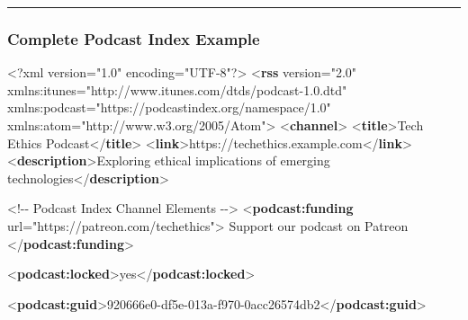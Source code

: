 \documentclass[
  letterpaper,
  DIV=11,
  numbers=noendperiod]{scrartcl}
\newenvironment{Shaded}{\begin{snugshade}}{\end{snugshade}}
\newcommand{\CommentTok}[1]{\textcolor[rgb]{0.37,0.37,0.37}{#1}}
\newcommand{\FunctionTok}[1]{\textcolor[rgb]{0.28,0.35,0.67}{#1}}
\newcommand{\KeywordTok}[1]{\textcolor[rgb]{0.00,0.23,0.31}{\textbf{#1}}}
\newcommand{\NormalTok}[1]{\textcolor[rgb]{0.00,0.23,0.31}{#1}}
\newcommand{\OtherTok}[1]{\textcolor[rgb]{0.00,0.23,0.31}{#1}}
\newcommand{\StringTok}[1]{\textcolor[rgb]{0.13,0.47,0.30}{#1}}
\begin{document}
\begin{center}\rule{0.5\linewidth}{0.5pt}\end{center}

\subsubsection{Complete Podcast Index
Example}\label{complete-podcast-index-example}

\begin{Shaded}
\begin{Highlighting}[]
\FunctionTok{\textless{}?xml}\OtherTok{ version=}\StringTok{"1.0"}\OtherTok{ encoding=}\StringTok{"UTF{-}8"}\FunctionTok{?\textgreater{}}
\NormalTok{\textless{}}\KeywordTok{rss}\OtherTok{ version=}\StringTok{"2.0"} 
\OtherTok{  xmlns:itunes=}\StringTok{"http://www.itunes.com/dtds/podcast{-}1.0.dtd"}
\OtherTok{     xmlns:podcast=}\StringTok{"https://podcastindex.org/namespace/1.0"}
\OtherTok{     xmlns:atom=}\StringTok{"http://www.w3.org/2005/Atom"}\NormalTok{\textgreater{}}
\NormalTok{  \textless{}}\KeywordTok{channel}\NormalTok{\textgreater{}}
\NormalTok{    \textless{}}\KeywordTok{title}\NormalTok{\textgreater{}Tech Ethics Podcast\textless{}/}\KeywordTok{title}\NormalTok{\textgreater{}}
\NormalTok{    \textless{}}\KeywordTok{link}\NormalTok{\textgreater{}https://techethics.example.com\textless{}/}\KeywordTok{link}\NormalTok{\textgreater{}}
\NormalTok{    \textless{}}\KeywordTok{description}\NormalTok{\textgreater{}Exploring ethical implications of emerging technologies\textless{}/}\KeywordTok{description}\NormalTok{\textgreater{}}
    
    \CommentTok{\textless{}!{-}{-} Podcast Index Channel Elements {-}{-}\textgreater{}}
\NormalTok{    \textless{}}\KeywordTok{podcast:funding}\OtherTok{ url=}\StringTok{"https://patreon.com/techethics"}\NormalTok{\textgreater{}}
\NormalTok{      Support our podcast on Patreon}
\NormalTok{    \textless{}/}\KeywordTok{podcast:funding}\NormalTok{\textgreater{}}
    
\NormalTok{    \textless{}}\KeywordTok{podcast:locked}\NormalTok{\textgreater{}yes\textless{}/}\KeywordTok{podcast:locked}\NormalTok{\textgreater{}}
    
\NormalTok{    \textless{}}\KeywordTok{podcast:guid}\NormalTok{\textgreater{}920666e0{-}df5e{-}013a{-}f970{-}0acc26574db2\textless{}/}\KeywordTok{podcast:guid}\NormalTok{\textgreater{}}
    

\end{Highlighting}
\end{Shaded}
\end{document}
